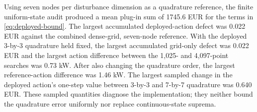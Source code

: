 Using seven nodes per disturbance dimension as a quadrature reference, the finite uniform-state audit produced a mean plug-in sum of 1745.6 EUR for the terms in \eqref{eq:deployed-bound}. The largest accumulated deployed-action defect was 0.022 EUR against the combined dense-grid, seven-node reference. With the deployed 3-by-3 quadrature held fixed, the largest accumulated grid-only defect was 0.022 EUR and the largest action difference between the 1,025- and 4,097-point searches was 0.73 kW. After also changing the quadrature order, the largest reference-action difference was 1.46 kW. The largest sampled change in the deployed action's one-step value between 3-by-3 and 7-by-7 quadrature was 0.640 EUR. These sampled quantities diagnose the implementation; they neither bound the quadrature error uniformly nor replace continuous-state suprema.